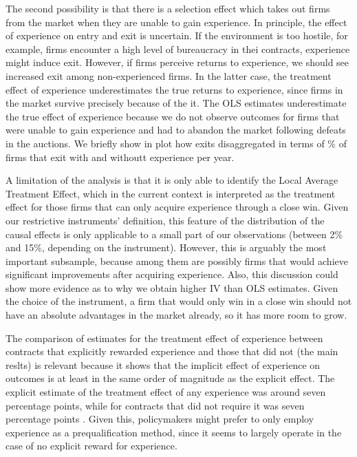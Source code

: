 The second possibility is that there is a selection effect which takes out firms from the market when they are unable to gain experience. In principle, the effect of experience on entry and exit is uncertain. If the environment is too hostile, for example, firms encounter a high level of bureaucracy in thei contracts, experience might induce exit. However, if firms perceive returns to experience, we should see increased exit among non-experienced firms. In the latter case, the treatment effect of experience underestimates the true returns to experience, since firms in the market survive precisely because of the it.  The OLS estimates underestimate the true effect of experience because we do not observe outcomes for firms that were unable to gain experience and had to abandon the market following defeats in the auctions. We briefly show in plot how exits disaggregated in terms of \% of firms that exit with and withoutt experience per year.

A limitation of the analysis is that it is only able to identify the Local Average Treatment Effect, which in the current context is interpreted as the treatment effect for those firms that can only acquire experience through a close win. Given our restrictive instruments' definition, this feature of the distribution of the causal effects is only applicable to a small part of our observations (between 2\% and 15\%, depending on the instrument). However, this is arguably the most important subsample, because among them are possibly firms that would achieve significant improvements after acquiring experience. Also, this discussion could show more evidence as to why we obtain higher IV than OLS estimates. Given the choice of the instrument, a firm that would only win in a close win should not have an absolute advantages in the market already, so it has more room to grow.

The comparison of estimates for the treatment effect of experience between contracts that explicitly rewarded experience and those that did not (the main reslts) is relevant because it shows that the implicit effect of experience on outcomes is at least in the same order of magnitude as the explicit effect. The explicit estimate of the treatment effect of any experience was around seven percentage points, while for contracts that did not require it was seven percentage points . Given this, policymakers might prefer to only employ experience as a prequalification method, since it seems to largely operate in the case of no explicit reward for experience.

